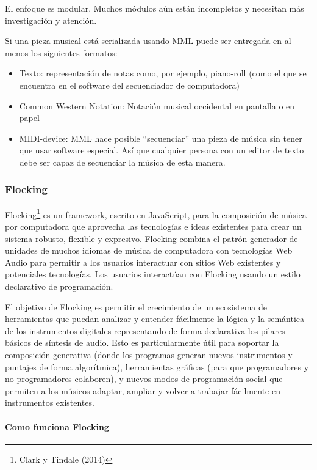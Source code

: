 \documentclass[]{article}
\let\oldparagraph\paragraph
\renewcommand{\paragraph}[1]{\oldparagraph{#1}\mbox{}}
\begin{document}
El enfoque es modular. Muchos módulos aún están incompletos y necesitan
más investigación y atención.

Si una pieza musical está serializada usando MML puede ser entregada en
al menos los siguientes formatos:

\begin{itemize}
\item
  Texto: representación de notas como, por ejemplo, piano-roll (como el
  que se encuentra en el software del secuenciador de computadora)
\item
  Common Western Notation: Notación musical occidental en pantalla o en
  papel
\item
  MIDI-device: MML hace posible ``secuenciar'' una pieza de música sin
  tener que usar software especial. Así que cualquier persona con un
  editor de texto debe ser capaz de secuenciar la música de esta manera.
\end{itemize}

\hypertarget{flocking}{%
\subsubsection{Flocking}\label{flocking}}

Flocking\footnote{Clark y Tindale (2014)} es un framework, escrito en
JavaScript, para la composición de música por computadora que aprovecha
las tecnologías e ideas existentes para crear un sistema robusto,
flexible y expresivo. Flocking combina el patrón generador de unidades
de muchos idiomas de música de computadora con tecnologías Web Audio
para permitir a los usuarios interactuar con sitios Web existentes y
potenciales tecnologías. Los usuarios interactúan con Flocking usando un
estilo declarativo de programación.

El objetivo de Flocking es permitir el crecimiento de un ecosistema de
herramientas que puedan analizar y entender fácilmente la lógica y la
semántica de los instrumentos digitales representando de forma
declarativa los pilares básicos de síntesis de audio. Esto es
particularmente útil para soportar la composición generativa (donde los
programas generan nuevos instrumentos y puntajes de forma algorítmica),
herramientas gráficas (para que programadores y no programadores
colaboren), y nuevos modos de programación social que permiten a los
músicos adaptar, ampliar y volver a trabajar fácilmente en instrumentos
existentes.

\hypertarget{como-funciona-flocking}{%
\paragraph{Como funciona Flocking}\label{como-funciona-flocking}}
\end{document}

